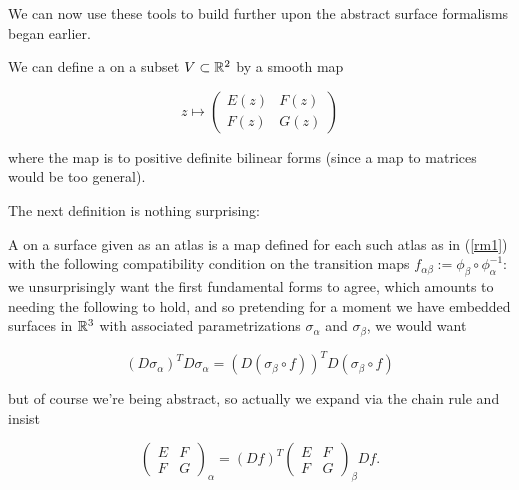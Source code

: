 \documentclass[11pt]{scrartcl}
\begin{document}
We can now use these tools to build further upon the abstract surface formalisms began earlier. 

\begin{definition}

We can define a  on a subset $V \subset \mathbb R^2$ by a smooth map

\begin{equation}
    z \mapsto \begin{pmatrix} E(z) & F(z) \\ F(z) & G(z) \end{pmatrix}
\end{equation}

where the map is to positive definite bilinear forms (since a map to matrices would be too general).
\label{rm1}
\end{definition}

The next definition is nothing surprising:

\begin{definition}

A  on a surface given as an atlas is a map defined for each such atlas as in (\ref{rm1}) with the following compatibility condition on the transition maps $f_{\alpha \beta} := \phi_\beta \circ \phi_\alpha^{-1}$: we unsurprisingly want the first fundamental forms to agree, which amounts to needing the following to hold, and so pretending for a moment we have embedded surfaces in $\mathbb R^3$ with associated parametrizations $\sigma_\alpha$ and $\sigma_\beta$, we would want

\begin{equation}
    (D\sigma_\alpha)^T D\sigma_\alpha = (D (\sigma_\beta \circ f))^T D(\sigma_\beta \circ f)
\end{equation}

but of course we're being abstract, so actually we expand via the chain rule and insist

\begin{equation}
    \begin{pmatrix} E & F \\ F & G \end{pmatrix}_\alpha = (Df)^T \begin{pmatrix} E & F \\ F & G \end{pmatrix}_\beta Df.
\end{equation}
\end{definition}
\end{document}

